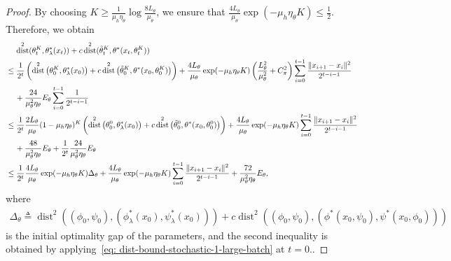 \documentclass{article}
\theoremstyle{plain}
\theoremstyle{definition}
\theoremstyle{remark}
\DeclareMathOperator{\dist}{dist}
\def\bydef{\triangleq}
\begin{document}
\begin{proof}
By choosing $K \geq \frac{1}{\mu_h\eta_\theta}
\log \frac{8L_\theta}{\mu_\theta}$, we ensure that $\frac{4L_{\theta}}{\mu_\theta}
\exp(-\mu_h\eta_\theta K)
\leq \frac{1}{2}$. Therefore, we obtain
    \begin{align}
        & \quad \, \dist^2(\theta_t^K, \theta_\lambda^*(x_t)) + c\dist^2 (\tilde{\theta}_t^K, \theta^*(x_t,\theta_t^K)) \notag \\
        & \leq \frac{1}{2^t} \left(\dist^2\left(\theta_{0}^K, \theta_\lambda^*(x_{0}) \right)+ c  \dist^2\left(\tilde{\theta}_{0}^K, \theta^*(x_{0},\theta_{0}^K)\right) \right) +  \frac{4L_{\theta}}{\mu_\theta} \exp( - \mu_h \eta_\theta K )  \left( \frac{L_{\theta}^2}{\mu^2_\theta}  +  C_{\pi}^2  \right) \sum_{i=0}^{t-1} \frac{\|x_{i+1} - x_{i} \|^2}{2^{t-i-1}} \notag \\
        & \quad \, + \frac{24}{\mu_\theta^2 \eta_\theta} E_\theta \sum_{i=0}^{t-1} \frac{1}{2^{t-i-1}} \notag \\
        & \leq \frac{1}{2^t} \frac{2L_{\theta}}{\mu_\theta} (1 - \mu_h \eta_\theta)^K  \left(\dist^2\left(\theta_0^0, \theta_\lambda^*(x_0) \right)+ c  \dist^2\left(\tilde{\theta}_0^0, \theta^*(x_0,\theta_0^0)\right)\right) + \frac{4 L_{\theta}}{\mu_\theta} \exp( - \mu_h \eta_\theta K ) \sum_{i=0}^{t-1} \frac{\|x_{i+1} - x_{i} \|^2}{2^{t-i-1}} \notag \\
        & \quad \, + \frac{48}{\mu_\theta^2 \eta_\theta}E_\theta + \frac{1}{2^t} \frac{24}{\mu_\theta^2 \eta_\theta} E_\theta \notag \\
        & \leq \frac{1}{2^t} \frac{4L_{\theta}}{\mu_\theta} \exp ( - \mu_h \eta_\theta K )   \Delta_\theta + \frac{4 L_{\theta}}{\mu_\theta} \exp( - \mu_h \eta_\theta K ) \sum_{i=0}^{t-1} \frac{\|x_{i+1} - x_{i} \|^2}{2^{t-i-1}} +  \frac{72}{\mu_\theta^2 \eta_\theta} E_\theta ,
    \end{align}
    where 
    \begin{align}
        \Delta_\theta \bydef\dist^2\left((\phi_0,\psi_0), \left(\phi_\lambda^*(x_0),\psi^*_\lambda(x_0) \right)\right)+ c  \dist^2\left((\phi_0,\psi_0), \left( \phi^*(x_0,\psi_0), \psi^*(x_0,\phi_0)\right)\right) \label{eq: definition-delta-theta-large-batch}
    \end{align}
    is the initial optimality gap of the parameters, and the second inequality is obtained by applying~\eqref{eq: dist-bound-stochastic-1-large-batch} at $t=0$..
    

\end{proof}
\end{document}
